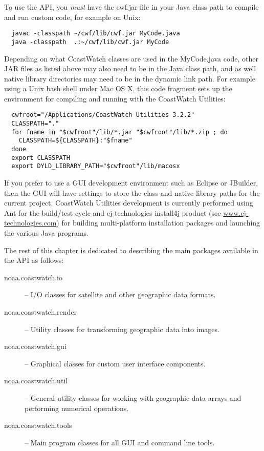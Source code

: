 To use the API, you {\em must} have the {\file cwf.jar} file in
your Java class path to compile and run custom code, for example
on Unix:
\begin{verbatim}
  javac -classpath ~/cwf/lib/cwf.jar MyCode.java
  java -classpath  .:~/cwf/lib/cwf.jar MyCode
\end{verbatim}
Depending on what CoastWatch classes are used in the
{\file MyCode.java} code, other JAR files as listed above may also
need to be in the Java class path, and as well native library
directories may need to be in the dynamic link path.  For example
using a Unix bash shell under Mac OS X, this code fragment sets
up the environment for compiling and running with the CoastWatch
Utilities:
\begin{verbatim}
  cwfroot="/Applications/CoastWatch Utilities 3.2.2"
  CLASSPATH="."
  for fname in "$cwfroot"/lib/*.jar "$cwfroot"/lib/*.zip ; do 
    CLASSPATH=${CLASSPATH}:"$fname"
  done
  export CLASSPATH
  export DYLD_LIBRARY_PATH="$cwfroot"/lib/macosx
\end{verbatim}
If you prefer to use a GUI development environment such as
Eclipse or JBuilder, then the GUI will have settings to store the
class and native library paths for the current project.
CoastWatch Utilities development is currently performed using Ant
for the build/test cycle and ej-technologies install4j product
(see \url{www.ej-technologies.com}) for building multi-platform
installation packages and launching the various Java programs.

The rest of this chapter is dedicated to describing the main
packages available in the API as follows:
\begin{description}

\item[{\java noaa.coastwatch.io}] -- I/O classes for satellite and
other geographic data formats.

\item[{\java noaa.coastwatch.render}] -- Utility classes for
transforming geographic data into images.

\item[{\java noaa.coastwatch.gui}] -- Graphical classes for custom
user interface components.

\item[{\java noaa.coastwatch.util}] -- General utility classes for
working with geographic data arrays and performing numerical
operations.

\item[{\java noaa.coastwatch.tools}] -- Main program classes for
all GUI and command line tools.

\end{description}

